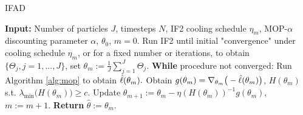 \documentclass[9pt,twocolumn,pnasresearcharticle]{pnas-new}
\begin{document}



\begin{algorithm}[H]
	\caption{IFAD}
    \label{alg:ifad}
	    \textbf{Input:} Number of particles $J$, timesteps $N$, IF2 cooling schedule $\eta_m$, MOP-$\alpha$ discounting parameter $\alpha$, $\theta_0$, $m=0.$\newline
        Run IF2 until initial "convergence" under cooling schedule $\eta_m$, or for a fixed number or iterations, to obtain $\{\Theta_j, j=1,...,J\}$, set $\theta_m := \frac{1}{J}\sum_{j=1}^J \Theta_j.$\newline
		\textbf{While} procedure not converged: \newline
		\hspace*{4mm} Run Algorithm \ref{alg:mop} to obtain $\hat{\ell}(\theta_m).$ \newline
		\hspace*{4mm} Obtain $g(\theta_m) = \nabla_{\theta_m} \big(-\hat{\ell}(\theta_m)\big)$, $H(\theta_m)$ s.t. $\lambda_{\min}\big(H(\theta_m)\big) \geq c$. \newline
		\hspace*{4mm} Update $\theta_{m+1} := \theta_m - \eta (H(\theta_m))^{-1} g(\theta_m)$, $m:=m+1.$ \newline
		\textbf{Return} $\hat{\theta} := \theta_m.$
\end{algorithm}
\end{document}
